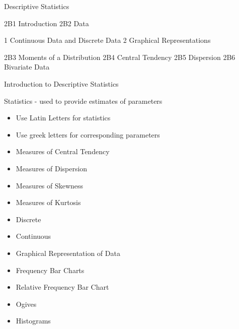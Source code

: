 Descriptive Statistics


2B1 Introduction
2B2 Data

1 Continuous Data and Discrete Data
2 Graphical Representations

2B3 Moments of a Distribution
2B4 Central Tendency
2B5 Dispersion
2B6 Bivariate Data



Introduction to Descriptive Statistics

Statistics - used to provide estimates of parameters

\begin{itemize}
\item Use Latin Letters for statistics
\item Use greek letters for corresponding parameters
\end{itemize}

\begin{itemize}
\item Measures of Central Tendency
\item Measures of Dispersion
\item Measures of Skewness
\item Measures of Kurtosis
\end{itemize}



\begin{itemize}
\item Discrete 
\item Continuous
\end{itemize}

\begin{itemize}
\item Graphical Representation of Data
\item Frequency Bar Charts
\item Relative Frequency Bar Chart
\item Ogives
\item Histograms
\end{itemize}

